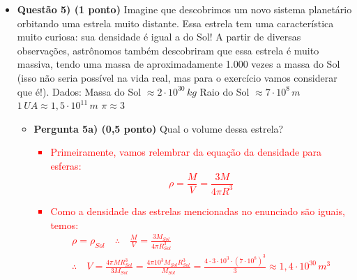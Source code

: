 \documentclass[a4paper, 12pt]{article}
\newcommand{\red}[1]{\textcolor{red}{#1}}
\begin{document}
\begin{flushleft}
\begin{itemize}
            \item \textbf{Questão 5) (1 ponto)} Imagine que descobrimos um novo sistema planetário orbitando uma estrela muito distante. Essa estrela tem uma característica muito curiosa: sua densidade é igual a do Sol! A partir de diversas observações, astrônomos também descobriram que essa estrela é muito massiva, tendo uma massa de aproximadamente 1.000 vezes a massa do Sol (isso não seria possível na vida real, mas para o exercício vamos considerar que é!). \linebreak \linebreak Dados: \linebreak Massa do Sol $\approx 2 \cdot 10^{30} \, kg$ \linebreak Raio do Sol $\approx 7 \cdot 10^{8} \, m$ \linebreak $1 \, UA \approx 1,5 \cdot 10^{11} \, m$ \linebreak $\pi \approx 3$
                \begin{itemize}
                    \item \textbf{Pergunta 5a) (0,5 ponto)} Qual o volume dessa estrela?
                        \red{\begin{itemize}
                            \item Primeiramente, vamos relembrar da equação da densidade para esferas:
                                \begin{equation*}
                                    \rho = \frac{M}{V}=\frac{3M}{4\pi R^3}
                                \end{equation*}
                            \item Como a densidade das estrelas mencionadas no enunciado são iguais, temos:
                                \begin{equation*} \begin{gathered}
                                    \rho = \rho_{Sol} \quad \therefore \quad \frac{M}{V}=\frac{3M_{Sol}}{4\pi R_{Sol}^3} \\
                                    \therefore \quad V =\frac{4\pi MR_ {Sol}^3}{3M_{Sol}}=\frac{4 \pi 10^3 M_{Sol} R_{Sol}^3}{M_{Sol}}=\frac{4\cdot 3 \cdot 10^3 \cdot \left(7 \cdot 10^8\right)^3}{3} \approx 1,4 \cdot 10^{30} \, m^3
                                \end{gathered} \end{equation*}
                        \end{itemize}}
                        \begin{itemize}

\end{itemize}
\end{itemize}
\end{itemize}
\end{flushleft}
\end{document}

